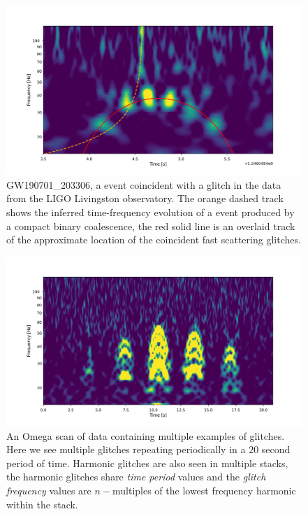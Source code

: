 \begin{figure}
  \includegraphics[width=\textwidth]{images/4_archenemy/Section1/GW190701_203306_overlay.pdf}
  \caption{GW190701\_203306, a \gw{} event coincident with a \scl{} glitch in the data from the LIGO Livingston observatory. The orange dashed track shows the inferred time-frequency evolution of a \gw{} event produced by a compact binary coalescence, the red solid line is an overlaid track of the approximate location of the coincident fast scattering glitches.}
  \label{4:fig:obscured_detection}
\end{figure}

\begin{figure}
  \includegraphics[width=\textwidth]{images/4_archenemy/Section1/multiple_harmonics.pdf}
  \caption{An Omega scan \cite{gwdetchar_tools:2021} of \gw{} data containing multiple examples of \scl{} glitches. Here we see multiple \scl{} glitches repeating periodically in a $20$ second period of time. Harmonic \scl{} glitches are also seen in multiple stacks, the harmonic glitches share \emph{time period} values and the \emph{glitch frequency} values are $n-$multiples of the lowest frequency harmonic within the stack.}
  \label{4:fig:consec_scattered_light}
\end{figure}

